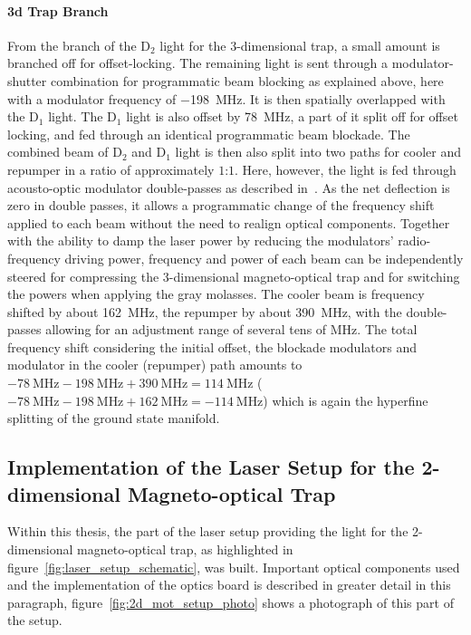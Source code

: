 \paragraph{3d Trap Branch} From the branch of the D$_2$ light for the 3-dimensional trap, a small amount is branched off for offset-locking. The remaining light is sent through a modulator-shutter combination for programmatic beam blocking as explained above, here with a modulator frequency of \SI{-198}{\mega\hertz}. It is then spatially overlapped with the D$_1$ light. The D$_1$ light is also offset by \SI{+78}{\mega\hertz}, a part of it split off for offset locking, and fed through an identical programmatic beam blockade. The combined beam of D$_2$ and D$_1$ light is then also split into two paths for cooler and repumper in a ratio of approximately $1$:$1$. Here, however, the light is fed through acousto-optic modulator double-passes as described in~\cite{qesja_design_2022}. As the net deflection is zero in double passes, it allows a programmatic change of the frequency shift applied to each beam without the need to realign optical components. Together with the ability to damp the laser power by reducing the modulators' radio-frequency driving power, frequency and power of each beam can be independently steered for compressing the 3-dimensional magneto-optical trap and for switching the powers when applying the gray molasses. The cooler beam is frequency shifted by about \SI{+162}{\mega\hertz}, the repumper by about \SI{+390}{\mega\hertz}, with the double-passes allowing for an adjustment range of several tens of \si{\mega\hertz}. The total frequency shift considering the initial offset, the blockade modulators and modulator in the cooler (repumper) path amounts to $\SI{-78}{\mega\hertz} - \SI{198}{\mega\hertz} + \SI{390}{\mega\hertz} = \SI{+114}{\mega\hertz}$ ($\SI{-78}{\mega\hertz} - \SI{198}{\mega\hertz} + \SI{162}{\mega\hertz} = \SI{-114}{\mega\hertz}$) which is again the hyperfine splitting of the ground state manifold.

\subsection*{Implementation of the Laser Setup for the 2-dimensional Magneto-optical Trap}
Within this thesis, the part of the laser setup providing the light for the 2-dimensional magneto-optical trap, as highlighted in figure~\ref{fig:laser_setup_schematic}, was built.
Important optical components used and the implementation of the optics board is described in greater detail in this paragraph, figure~\ref{fig:2d_mot_setup_photo} shows a photograph of this part of the setup.

